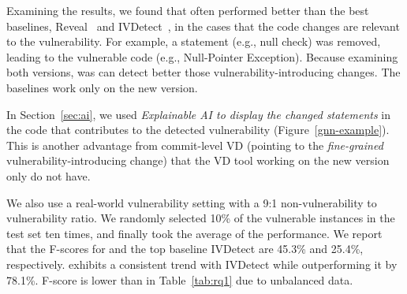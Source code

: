 
Examining the results, we found that {\tool} often performed better
than the best baselines, Reveal~\cite{chakraborty2021deep} and
IVDetect~\cite{li2021vulnerability}, in the cases that the code
changes are relevant to the vulnerability. For example, a statement
(e.g., null check) was removed, leading to the vulnerable code (e.g.,
Null-Pointer Exception). Because examining both versions, {\tool} was
can detect better those vulnerability-introducing changes. The baselines
work only on the new version.

In Section~\ref{sec:ai}, we used {\em Explainable AI to display the
changed statements} in the code that contributes to the detected
vulnerability (Figure~\ref{gnn-example}). This is another advantage
from commit-level VD (pointing to the {\em fine-grained}
vulnerability-introducing change) that the VD tool working on the new
version only do not have.






We also use a real-world vulnerability setting with a 9:1
non-vulnerability to vulnerability ratio. We randomly selected 10\% of
the vulnerable instances in the test set ten times, and finally took
the average of the performance. We report that the F-scores for
{\tool} and the top baseline IVDetect are 45.3\% and 25.4\%,
respectively. {\tool} exhibits a consistent trend with IVDetect while
outperforming it by 78.1\%. F-score is lower than in Table~\ref{tab:rq1} due to
unbalanced data.

